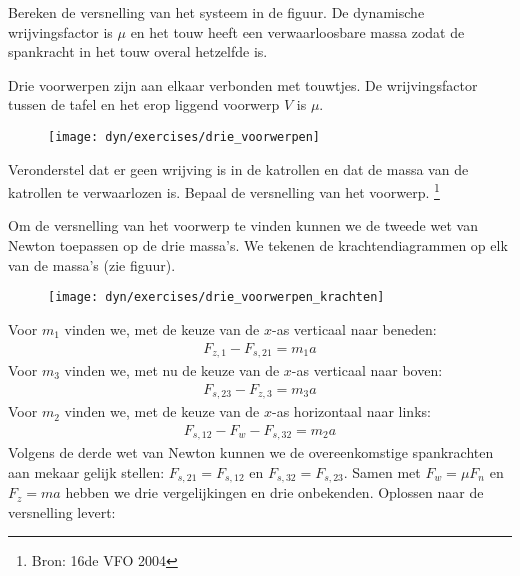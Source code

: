 \documentclass{ximera}
\begin{document}
\begin{exercise} Bereken de versnelling van het systeem in de figuur. De dynamische wrijvingsfactor is $\mu$ en het touw heeft een verwaarloosbare massa zodat de spankracht in het touw overal hetzelfde is. 


\end{exercise}

\begin{exercise} Drie voorwerpen zijn aan elkaar verbonden met touwtjes. De wrij\-vings\-factor tussen de tafel en het erop liggend voorwerp $V$ is $\mu$.
\begin{figure}[h]
\begin{center}
\texttt{[image: dyn/exercises/drie\_voorwerpen]}
\end{center}
\end{figure}
Veronderstel dat er geen wrijving is in de katrollen en dat de massa van de katrollen te verwaarlozen is. Bepaal de versnelling van het voorwerp. \footnote{Bron: 16de VFO 2004}
\begin{oplossing}
\newline
Om de versnelling van het voorwerp te vinden kunnen we de tweede wet van Newton toepassen op de drie massa's. We tekenen de krachtendiagrammen op elk van de massa's (zie figuur). 
\begin{figure}[h]
\begin{center}
\texttt{[image: dyn/exercises/drie\_voorwerpen\_krachten]}
\end{center}
\end{figure}
\newline
Voor $m_1$ vinden we, met de keuze van de $x$-as verticaal naar beneden:
\begin{eqnarray}
F_{z,1}-F_{s,21}=m_1a\label{m_1}
\end{eqnarray}
Voor $m_3$ vinden we, met nu de keuze van de $x$-as verticaal naar boven:
\begin{eqnarray}
F_{s,23}-F_{z,3}=m_3a\label{m_3}
\end{eqnarray}
Voor $m_2$ vinden we, met de keuze van de $x$-as horizontaal naar links:
\begin{eqnarray}
F_{s,12}-F_w-F_{s,32}=m_2a\label{m_2}
\end{eqnarray}
Volgens de derde wet van Newton kunnen we de overeenkomstige spankrachten aan mekaar gelijk stellen: $F_{s,21}=F_{s,12}$ en $F_{s,32}=F_{s,23}$. Samen met $F_w=\mu F_n$ en $F_z=ma$ hebben we drie vergelijkingen en drie onbekenden. Oplossen naar de versnelling levert:

\end{oplossing}
\end{exercise}
\end{document}
